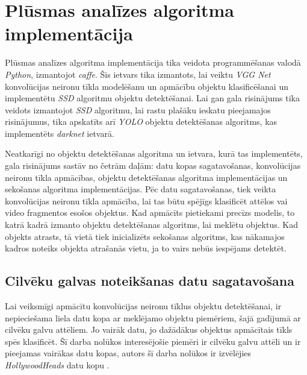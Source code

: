\chapter{Plūsmas analīzes algoritma implementācija}
Plūsmas analīzes algoritma implementācija tika veidota programmēšanas valodā \textit{Python}, izmantojot \textit{caffe}. Šis ietvars tika izmantots, lai veiktu \textit{VGG Net} konvolūcijas neironu tīkla modelēšanu un apmācību objektu klasificēšanai un implementētu \textit{SSD} algoritmu objektu detektēšanai. Lai gan gala risinājums tika veidots izmantojot \textit{SSD} algoritmu, lai rastu plašāku ieskatu pieejamajos risinājumus, tika apskatīts arī \textit{YOLO} objektu detektēšanas algoritms, kas implementēts \textit{darknet} ietvarā.

Neatkarīgi no objektu detektēšanas algoritma un ietvara, kurā tas implementēts, gala risinājums sastāv no četrām daļām: datu kopas sagatavošanas, konvolūcijas neironu tīkla apmācības, objektu detektēšanas algoritma implementācijas un sekošanas algoritma implementācijas. Pēc datu sagatavošanas, tiek veikta konvolūcijas neironu tīkla apmācība,  lai tas būtu spējīgs klasificēt attēlos vai video fragmentos esošos objektus. Kad apmācīts pietiekami precīzs modelis, to katrā kadrā izmanto objektu detektēšanas algoritms, lai meklētu objektus. Kad objekts atrasts, tā vietā tiek inicializēts sekošanas algoritms, kas nākamajos kadros noteiks objekta atrašanās vietu, ja to vairs nebūs iespējams detektēt. 
\section{Cilvēku galvas noteikšanas datu sagatavošana}
Lai veiksmīgi apmācītu konvolūcijas neironu tīklus objektu detektēšanai, ir nepieciešama liela datu kopa ar meklējamo objektu piemēriem, šajā gadījumā ar cilvēku galvu attēliem. Jo vairāk datu, jo dažādākus objektus apmācītais tīkls spēs klasificēt. Šī darba nolūkos interesējošie piemēri ir cilvēku galvu attēli un ir pieejamas vairākas datu kopas, autors šī darba nolūkos ir izvēlējies \textit{HollywoodHeads} datu kopu \cite{vu15heads}. 

